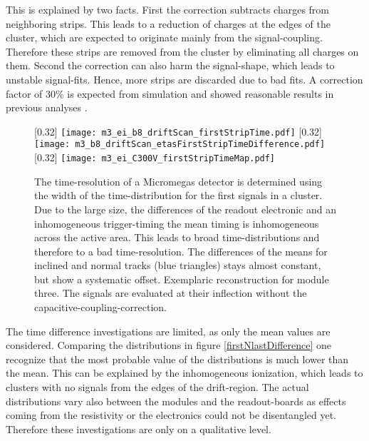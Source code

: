 \documentclass[
twoside,            %
BCOR1.4cm,          %
10pt,               %
headings=normal,    %
headsepline,        %
clearplainpage,		%
final,              %
div=14,
open=right,
bibliography=toc
]{scrreprt}
\begin{document}
This is explained by two facts.
First the correction subtracts charges from neighboring strips.
This leads to a reduction of charges at the edges of the cluster, which are expected to originate mainly from the signal-coupling.
Therefore these strips are removed from the cluster by eliminating all charges on them.
Second the correction can also harm the signal-shape, which leads to unstable signal-fits.
Hence, more strips are discarded due to bad fits.
A correction factor of 30\% is expected from simulation \cite{loeselThesis} and showed reasonable results in previous analyses \cite{flierlThesis}.

\begin{figure}[!h]
	\centering
	[0.32\textwidth]
	{\texttt{[image: m3\_ei\_b8\_driftScan\_firstStripTime.pdf]}}
	\hfill
	[0.32\textwidth]
	{\texttt{[image: m3\_b8\_driftScan\_etasFirstStripTimeDifference.pdf]}}
	\hfill
	[0.32\textwidth]
	{\texttt{[image: m3\_ei\_C300V\_firstStripTimeMap.pdf]}}
	\vspace{-2mm}
	\caption{
		The time-resolution of a Micromegas detector is determined using the width of the time-distribution for the first signals in a cluster.
		Due to the large size, the differences of the readout electronic and an inhomogeneous trigger-timing the mean timing is inhomogeneous across the active area.
		This leads to broad time-distributions and therefore to a bad time-resolution.
		The differences of the means for inclined and normal tracks (blue triangles) stays almost constant, but show a systematic offset.
		Exemplaric reconstruction for module three.
		The signals are evaluated at their inflection without the capacitive-coupling-correction.
	}
	\label{timeResolution}
\end{figure}

The time difference investigations are limited, as only the mean values are considered.
Comparing the distributions in figure \ref{firstNlastDifference} one recognize that the most probable value of the distributions is much lower than the mean.
This can be explained by the inhomogeneous ionization, which leads to clusters with no signals from the edges of the drift-region.
The actual distributions vary also between the modules and the readout-boards as effects coming from the resistivity or the electronics could not be disentangled yet.
Therefore these investigations are only on a qualitative level.
\end{document}

